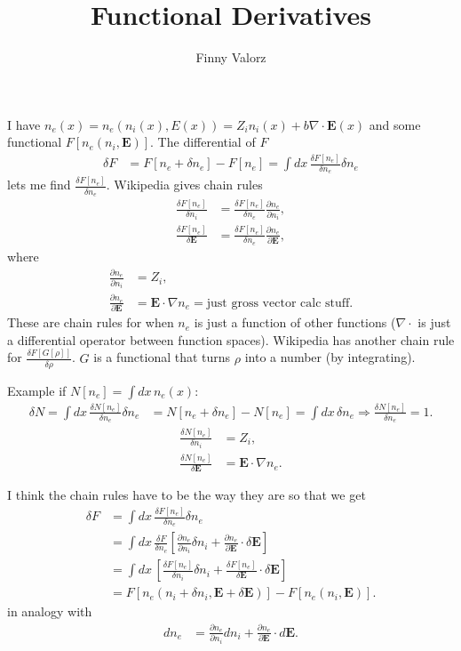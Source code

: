 \documentclass{article}
\title{Functional Derivatives}
\author{Finny Valorz}
\newcommand{\p}{\partial}
\newcommand{\deriv}[2]{\frac{\p #1}{\p #2}}
\begin{document}
\maketitle

I have $n_e(x) = n_e(n_i(x), E(x)) = Z_in_i(x) + b\nabla\cdot \bm{E}(x)$ and some functional $F[n_e(n_i,\bm{E})]$. The differential of $F$ 
\begin{align*}
    \delta F &= F[n_e+\delta n_e] - F[n_e] = \int dx\, \frac{\delta F[n_e]}{\delta n_e} \delta n_e 
\end{align*}
lets me find $\frac{\delta F[n_e]}{\delta n_e}$. Wikipedia gives chain rules
\begin{align*}
    \frac{\delta F[n_e]}{\delta n_i} &= \frac{\delta F[n_e]}{\delta n_e} \deriv{n_e}{n_i}, \\ 
    \frac{\delta F[n_e]}{\delta \bm{E}} &= \frac{\delta F[n_e]}{\delta n_e} \deriv{n_e}{\bm{E}}, 
\end{align*} 
where 
\begin{align*}
    \deriv{n_e}{n_i} &= Z_i, \\
    \deriv{n_e}{\bm{E}} &= \bm{E}\cdot\nabla n_e = \text{just gross vector calc stuff}. 
\end{align*}
These are chain rules for when $n_e$ is just a function of other functions ($\nabla\cdot$ is just a differential operator between function spaces). Wikipedia has another chain rule for $\frac{\delta F[G[\rho]]}{\delta\rho}$. $G$ is a functional that turns $\rho$ into a number (by integrating). 

Example if $N[n_e] = \int dx\,n_e(x)$:
\begin{align*}
    \delta N = \int dx\,\frac{\delta N[n_e]}{\delta n_e} \delta n_e 
    &= N[n_e + \delta n_e] - N[n_e] = \int dx\,\delta n_e \Longrightarrow \frac{\delta N[n_e]}{\delta n_e} = 1. 
\end{align*}
\begin{align*}
    \frac{\delta N[n_e]}{\delta n_i} &= Z_i, \\ 
    \frac{\delta N[n_e]}{\delta\bm{E}} &= \bm{E}\cdot\nabla n_e. 
\end{align*}
\hrulefill


I think the chain rules have to be the way they are so that we get  
\begin{align*}
    \delta F &= \int dx\,\frac{\delta F[n_e]}{\delta n_e} \delta n_e \\ 
    &= \int dx\,\frac{\delta F}{\delta n_e} \left[ \deriv{n_e}{n_i}\delta n_i + \deriv{n_e}{\bm{E}}\cdot\delta\bm{E} \right] \\ 
    &= \int dx\,\left[ \frac{\delta F[n_e]}{\delta n_i} \delta n_i + \frac{\delta F[n_e]}{\delta\bm{E}}\cdot\delta\bm{E}\right] \\ 
    &= F[n_e(n_i+\delta n_i, \bm{E}+\delta\bm{E})] - F[n_e(n_i,\bm{E})]. 
\end{align*}
in analogy with 
\begin{align*}
    dn_e &= \deriv{n_e}{n_i} dn_i + \deriv{n_e}{\bm{E}}\cdot d\bm{E}.
\end{align*}
\hrulefill
\end{document}
